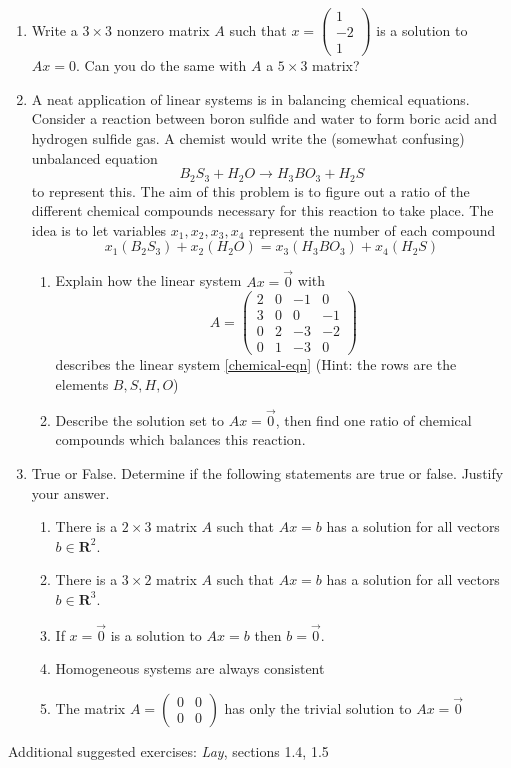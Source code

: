 \documentclass[12pt]{article}
\numberwithin{equation}{subsection}
\numberwithin{figure}{subsection}
\theoremstyle{note}
\begin{document}
\begin{enumerate}[label=\arabic*.]
\begin{enumerate}
	\end{enumerate}
	\item Write a $3\times 3$ nonzero matrix $A$ such that $x=\begin{pmatrix} 1 \\ -2 \\ 1 \end{pmatrix}$ is a solution to $Ax=0$. Can you do the same with $A$ a $5\times 3$ matrix? 
	
	\item A neat application of linear systems is in balancing chemical equations. Consider a reaction between boron sulfide and water to form boric acid and hydrogen sulfide gas. A chemist would write the (somewhat confusing) unbalanced equation \[ B_2S_3 + H_2 O \to H_3 BO_3 + H_2 S\] to represent this. The aim of this problem is to figure out a ratio of the different chemical compounds necessary for this reaction to take place. The idea is to let variables $x_1,x_2,x_3,x_4$ represent the number of each compound \begin{equation} \label{chemical-eqn} x_1(B_2S_3) + x_2(H_2 O) = x_3(H_3 BO_3) + x_4(H_2 S) \end{equation}
	\begin{enumerate}
		\item Explain how the linear system $Ax=\vec{0}$ with \[ A= \begin{pmatrix} 2 & 0 & -1 & 0 \\ 3 & 0 & 0 & -1 \\ 0 & 2 & -3 & -2 \\ 0 & 1 & -3 & 0 \end{pmatrix} \] describes the linear system \eqref{chemical-eqn} (Hint: the rows are the elements $B,S, H, O$)
		\item Describe the solution set to $Ax=\vec{0}$, then find one ratio of chemical compounds which balances this reaction. 
	\end{enumerate}
	\item True or False. Determine if the following statements are true or false. Justify your answer. 
	\begin{enumerate}
		\item There is a $2\times 3$ matrix $A$ such that ${Ax}={b}$ has a solution for all vectors ${b}\in \mathbf{R}^2$. 
		\item There is a $3\times 2$ matrix $A$ such that ${Ax}={b}$ has a solution for all vectors ${b}\in \mathbf{R}^3$. 
		\item If $x=\vec{0}$ is a solution to $Ax=b$ then $b=\vec{0}$.
		\item Homogeneous systems are always consistent 
		\item The matrix $A=\begin{pmatrix} 0 & 0 \\ 0 & 0 \end{pmatrix}$ has only the trivial solution to $Ax=\vec{0}$
	\end{enumerate}
	\end{enumerate}
	Additional suggested exercises: \textit{Lay}, sections 1.4, 1.5
\end{document}
